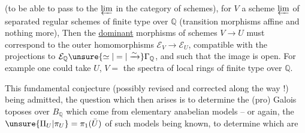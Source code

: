 (to be able to pass to the $\varprojlim$ in the category of schemes), for $V$ a scheme $\varprojlim$ of separated regular schemes of finite type over $\mathbb{Q}$ (transition morphisms  affine and nothing more), Then the \uline{dominant} morphisms of schemes $V\longrightarrow U$ must correspond to the outer homomorphisms $\mathcal{E}_V\longrightarrow\mathcal{E}_U$, compatible with the projections to $\mathcal{E}_{\mathbb{Q}}\unsure{\simeq|=|\xrightarrow{\sim}}\Gamma_{\mathbb{Q}}$, and such that the image is open. For example one could take  $U$, \unsure{,} $V=$ the spectra of local rings  of finite type over $\mathbb{Q}$.


This fundamental conjecture (possibly revised and corrected along the way !) being admitted, the question which then arises is to determine the (pro) Galois toposes over $B_{\mathbb{Q}}$ which come from elementary anabelian models -- or again, the $\unsure{\Pi_U|\pi_U}=\pi_1(\bar U)$ of such models being known, to determine which are
